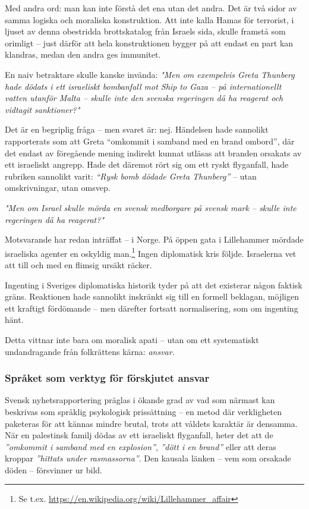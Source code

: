 \documentclass[12pt]{article}
\begin{document}
Med andra ord: man kan inte förstå det ena utan det andra. Det är två sidor av samma logiska och moraliska konstruktion. Att inte kalla Hamas för terrorist, i ljuset av denna obestridda brottskatalog från Israels sida, skulle framstå som orimligt – just därför att hela konstruktionen bygger på att endast en part kan klandras, medan den andra ges immunitet.

En naiv betraktare skulle kanske invända:
\textit{"Men om exempelvis Greta Thunberg hade dödats i ett israeliskt bombanfall mot Ship to Gaza – på internationellt vatten utanför Malta – skulle inte den svenska regeringen då ha reagerat och vidtagit sanktioner?"}

Det är en begriplig fråga – men svaret är: nej. Händelsen hade sannolikt rapporterats som att Greta “omkommit i samband med en brand ombord”, där det endast av föregående mening indirekt kunnat utläsas att branden orsakats av ett israeliskt angrepp. Hade det däremot rört sig om ett ryskt flyganfall, hade rubriken sannolikt varit: \textit{“Rysk bomb dödade Greta Thunberg”} – utan omskrivningar, utan omsvep.

\textit{"Men om Israel skulle mörda en svensk medborgare på svensk mark – skulle inte regeringen då ha reagerat?"}

Motsvarande har redan inträffat – i Norge. På öppen gata i Lillehammer mördade israeliska agenter en oskyldig man.\footnote{Se t.ex. \url{https://en.wikipedia.org/wiki/Lillehammer_affair}} Ingen diplomatisk kris följde. Israelerna vet att till och med en flimsig ursäkt räcker.

Ingenting i Sveriges diplomatiska historik tyder på att det existerar någon faktisk gräns. Reaktionen hade sannolikt inskränkt sig till en formell beklagan, möjligen ett kraftigt fördömande – men därefter fortsatt normalisering, som om ingenting hänt.

Detta vittnar inte bara om moralisk apati – utan om ett systematiskt undandragande från folkrättens kärna: \textit{ansvar}.



\subsubsection*{Språket som verktyg för förskjutet ansvar}

Svensk nyhetsrapportering präglas i ökande grad av vad som närmast kan beskrivas som språklig psykologisk prissättning – en metod där verkligheten paketeras för att kännas mindre brutal, trots att våldets karaktär är densamma.
När en palestinsk familj dödas av ett israeliskt flyganfall, heter det att de \textit{”omkommit i samband med en explosion”}, \textit{”dött i en brand”} eller att deras kroppar \textit{”hittats under rasmassorna”}. Den kausala länken – vem som orsakade döden – försvinner ur bild.
\end{document}
